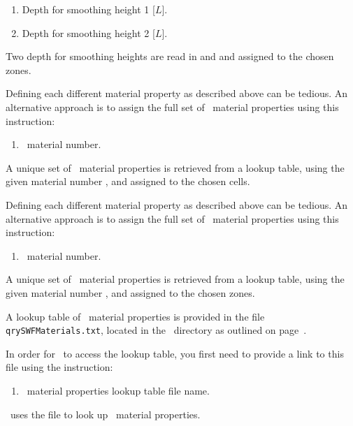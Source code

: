     {
        \squish
        \begin{enumerate}
        \item {}  Depth for smoothing height 1 [$L$].
        \item {}  Depth for smoothing height 2 [$L$].
        \end{enumerate}
          Two depth for smoothing heights are read in  and  and assigned to the chosen zones.
    }

Defining each different material property as described above can be tedious.  An alternative approach is to assign the full set of \gwf\ material properties using this instruction:

    {
        \squish
        \begin{enumerate}
        \item {}  \gwf\ material number.
        \end{enumerate}
          A unique set of \gwf\ material properties is retrieved from a lookup table, using the given  material number , and assigned to the chosen cells.
    }

Defining each different material property as described above can be tedious.  An alternative approach is to assign the full set of \swf\ material properties using this instruction:

    {
        \squish
        \begin{enumerate}
        \item {}  \swf\ material number.
        \end{enumerate}
          A unique set of \swf\ material properties is retrieved from a lookup table, using the given  material number , and assigned to the chosen zones.
    }


A lookup table of \swf\ material properties  is provided in the file \texttt{qrySWFMaterials.txt}, located in the \bin\ directory as outlined on page~\pageref{page:userbin}.

In order for \mut\ to access the lookup table, you first need to provide a link to this file using the instruction:

    {
        \squish
        \begin{enumerate}
        \item {}  \swf\ material properties lookup table file name.
        \end{enumerate}
          \mut\ uses the file  to look up \swf\ material properties.
    }


